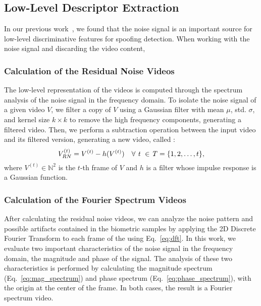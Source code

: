 \subsection{Low-Level Descriptor Extraction}
In our previous work~\cite{Pinto:SIBGRAPI:2012}, we found that the noise signal is an important source for low-level discriminative features for spoofing detection. When working with the noise signal and discarding the video content,  


\subsubsection{Calculation of the Residual Noise Videos}
The low-level representation of the videos is computed through the spectrum analysis of the noise signal in the frequency domain. To isolate the noise signal of a given video $V$, we filter a copy of $V$ using a Gaussian filter with mean $\mu$, std. $\sigma$, and kernel size $k \times k$ to remove the high frequency components, generating a filtered video. Then, we perform a subtraction operation between the input video and its filtered version, generating a new video, called : 
\begin{equation}
V_{RN}^{(t)} = V^{(t)} - h(V^{(t)}) \quad \forall \textrm{ \textit{t} } \in \mathit{T} =\{1, 2, \ldots, t\},
\label{eq:ruido}
\end{equation}
\noindent where $V^{(t)} \in \mathbb{N}^2$ is the $t$-th frame of $V$ and $h$ is a filter whose impulse response is a Gaussian function.

\subsubsection{Calculation of the Fourier Spectrum Videos}
After calculating the residual noise videos, we can analyze the noise pattern and possible artifacts contained in the biometric samples by applying the 2D Discrete Fourier Transform to each frame of the  using Eq.~\ref{eq:dft}. In this work, we evaluate two important characteristics of the noise signal in the frequency domain, the magnitude and phase of the signal. The analysis of these two characteristics is performed by calculating the magnitude spectrum (Eq.~\ref{eq:mag_spectrum}) and phase spectrum (Eq.~\ref{eq:phase_spectrum}), with the origin at the center of the frame. In both cases, the result is a Fourier spectrum video.

